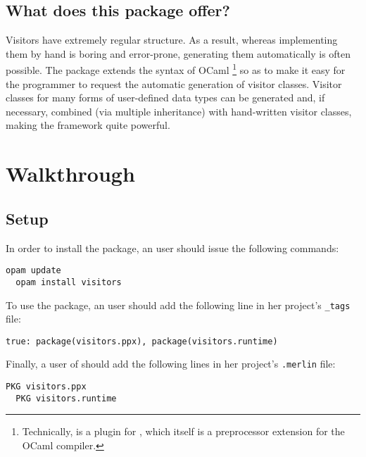 \documentclass[11pt,a4paper,twoside]{article}
\begin{document}


\subsection{What does this package offer?}

Visitors have extremely regular structure. As a result, whereas implementing
them by hand is boring and error-prone, generating them automatically is often
possible. The \visitors package extends the syntax of OCaml%
%
\footnote{Technically, \visitors is a plugin for \ppxderiving, which itself is
  a preprocessor extension for the OCaml compiler.}
%
so as to make it easy for the programmer to request the automatic generation
of visitor classes. Visitor classes for many forms of user-defined data types
can be generated and, if necessary, combined (via multiple inheritance) with
hand-written visitor classes, making the framework quite powerful.


\section{Walkthrough}


\subsection{Setup}
\label{sec:intro:setup}

In order to install the \visitors package, an \opam user should issue the
following commands:
\begin{lstlisting}[keywords={}]
  opam update
  opam install visitors
\end{lstlisting}
To use the package, an \ocamlbuild user should add the
following line in her project's \texttt{\_tags} file:
\begin{lstlisting}[keywords={}]
  true: package(visitors.ppx), package(visitors.runtime)
\end{lstlisting}
Finally, a user of \merlin should add the following lines in her project's
\texttt{.merlin} file:
\begin{lstlisting}[keywords={}]
  PKG visitors.ppx
  PKG visitors.runtime
\end{lstlisting}
\end{document}
